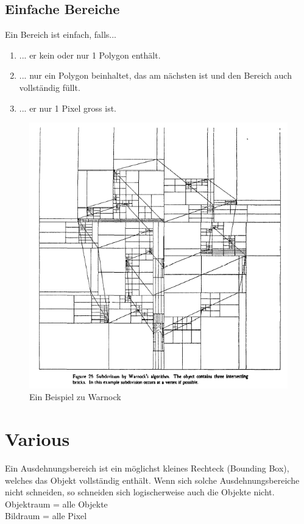 \subsection{Einfache Bereiche}
Ein Bereich ist einfach, falls...
\begin{enumerate}
	\item ... er kein oder nur 1 Polygon enthält.
	\item ... nur ein Polygon beinhaltet, das am nächsten ist und den Bereich auch vollständig füllt.
	\item ... er nur 1 Pixel gross ist.
\end{enumerate}
\begin{figure}[!ht]
	\centering
	\includegraphics[width=0.5\linewidth]{fig/warnock}
	\caption{Ein Beispiel zu Warnock}
	\label{fig:warnock}
\end{figure}
\section{Various}
Ein Ausdehnungsbereich ist ein möglichst kleines Rechteck (Bounding Box), welches das Objekt vollständig enthält. Wenn sich solche Ausdehnungsbereiche nicht schneiden, so schneiden sich logischerweise auch die Objekte nicht.\\
Objektraum = alle Objekte\\
Bildraum = alle Pixel